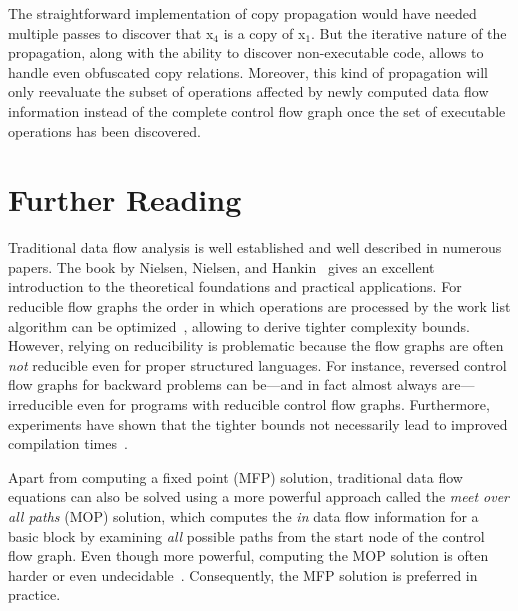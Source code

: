 The straightforward implementation of copy propagation would have needed
multiple passes to discover that x$_4$ is a copy of x$_1$.  But the iterative
nature of the propagation, along with the ability to discover non-executable
code, allows to handle even obfuscated copy relations. Moreover, this kind of
propagation will only reevaluate the subset of operations affected by newly
computed data flow information instead of the complete control flow graph once
the set of executable operations has been discovered.

\section{Further Reading}
\label{novillo:sec:further_reading}


Traditional data flow analysis is well established and well described in
numerous papers. The book by Nielsen, Nielsen, and
Hankin~\cite{novillo:bib:NNH99} gives an excellent introduction to the
theoretical foundations and practical applications.
For reducible flow graphs the order in which operations are processed by the
work list algorithm can be
optimized~\cite{novillo:bib:HU73,novillo:bib:KU76,novillo:bib:NNH99}, allowing
to derive tighter complexity bounds. However, relying on reducibility is
problematic because the flow graphs are often \emph{not} reducible even for
proper structured languages. For instance, reversed control flow graphs for backward
problems can be---and in fact almost always are---irreducible even for programs
with reducible control flow graphs. Furthermore, experiments have shown that the
tighter bounds not necessarily lead to improved compilation
times~\cite{novillo:bib:CTK06}.

Apart from computing a fixed point (MFP) solution, traditional data flow
equations can also
be solved using a more powerful approach called the \emph{meet over all paths}
(MOP) solution, which computes the \emph{in} data flow information for a basic
block by examining \emph{all} possible paths from the start node of the control
flow graph. Even though more powerful, computing the MOP solution is often
harder or even undecidable~\cite{novillo:bib:NNH99}. Consequently,
the MFP solution is preferred in practice.

